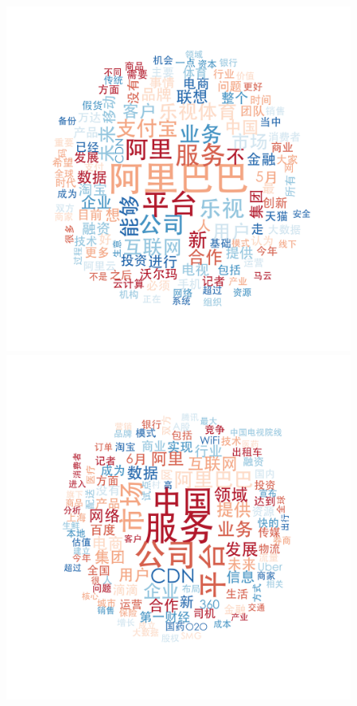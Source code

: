 \documentclass{beamer}
\begin{document}
\begin{frame}
\begin{figure}
    \includegraphics[height=0.3\textheight]{plot/May-wordcloud.png}    \includegraphics[height=0.3\textheight]{plot/Jun-wordcloud.png}

\end{figure}
\end{frame}
\end{document}
